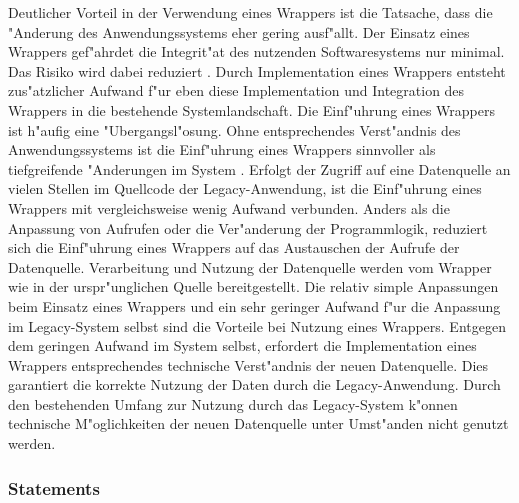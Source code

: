 %
%
%

Deutlicher Vorteil in der Verwendung eines Wrappers ist die Tatsache, dass die "Anderung des Anwendungssystems eher gering ausf"allt. Der Einsatz eines Wrappers gef"ahrdet die Integrit"at des nutzenden Softwaresystems nur minimal. Das Risiko wird dabei reduziert \citep{henrard-2002}. 
\lb
Durch Implementation eines Wrappers entsteht zus"atzlicher Aufwand f"ur eben diese Implementation und Integration des Wrappers in die bestehende Systemlandschaft. Die Einf"uhrung eines Wrappers ist h"aufig eine "Ubergangsl"osung. Ohne entsprechendes Verst"andnis des Anwendungssystems ist die Einf"uhrung eines Wrappers sinnvoller als tiefgreifende "Anderungen im System \citep{henrard-2002}.
\lb
Erfolgt der Zugriff auf eine Datenquelle an vielen Stellen im Quellcode der Legacy-Anwendung, ist die Einf"uhrung eines Wrappers mit vergleichsweise wenig Aufwand verbunden. Anders als die Anpassung von Aufrufen oder die Ver"anderung der Programmlogik, reduziert sich die Einf"uhrung eines Wrappers auf das Austauschen der Aufrufe der Datenquelle. Verarbeitung und Nutzung der Datenquelle werden vom Wrapper wie in der urspr"unglichen Quelle bereitgestellt. Die relativ simple Anpassungen beim Einsatz eines Wrappers und ein sehr geringer Aufwand f"ur die Anpassung im Legacy-System selbst sind die Vorteile bei Nutzung eines Wrappers. Entgegen dem geringen Aufwand im System selbst, erfordert die Implementation eines Wrappers entsprechendes technische Verst"andnis der neuen Datenquelle. Dies garantiert die korrekte Nutzung der Daten durch die Legacy-Anwendung. Durch den bestehenden Umfang zur Nutzung durch das Legacy-System k"onnen technische M"oglichkeiten der neuen Datenquelle unter Umst"anden nicht genutzt werden.

\subsubsection{Statements}

